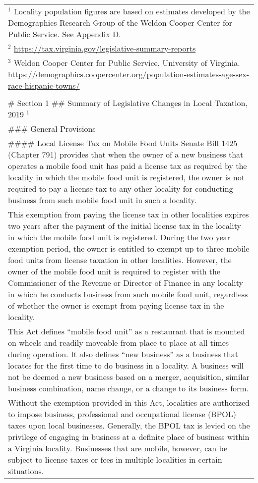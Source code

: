 \documentclass[
]{book}
\begin{document}
\begin{longtable}[]{@{}
  >{\raggedright\arraybackslash}p{}@{}}
\toprule
\endhead
\(^1\) Locality population figures are based on estimates developed by the Demographics Research Group of the Weldon Cooper Center for Public Service. See Appendix D. \\
\(^2\) \url{https://tax.virginia.gov/legislative-summary-reports} \\
\(^3\) Weldon Cooper Center for Public Service, University of Virginia. \url{https://demographics.coopercenter.org/population-estimates-age-sex-race-hispanic-towns/} \\
 \\
\# Section 1
\#\# Summary of Legislative Changes in Local Taxation, 2019 \(^1\) \\
\#\#\# General Provisions \\
\#\#\#\# Local License Tax on Mobile Food Units
Senate Bill 1425 (Chapter 791) provides that when the owner of a new business that operates a mobile food unit has paid a license tax as required by the locality in which the mobile food unit is registered, the owner is not required to pay a license tax to any other locality for conducting business from such mobile food unit in such a locality. \\
This exemption from paying the license tax in other localities expires two years after the payment of the initial license tax in the locality in which the mobile food unit is registered. During the two year exemption period, the owner is entitled to exempt up to three mobile food units from license taxation in other localities. However, the owner of the mobile food unit is required to register with the Commissioner of the Revenue or Director of Finance in any locality in which he conducts business from such mobile food unit, regardless of whether the owner is exempt from paying license tax in the locality. \\
This Act defines ``mobile food unit'' as a restaurant that is mounted on wheels and readily moveable from place to place at all times during operation. It also defines ``new business'' as a business that locates for the first time to do business in a locality. A business will not be deemed a new business based on a merger, acquisition, similar business combination, name change, or a change to its business form. \\
Without the exemption provided in this Act, localities are authorized to impose business, professional and occupational license (BPOL) taxes upon local businesses. Generally, the BPOL tax is levied on the privilege of engaging in business at a definite place of business within a Virginia locality. Businesses that are mobile, however, can be subject to license taxes or fees in multiple localities in certain situations. \\

\end{longtable}
\end{document}
